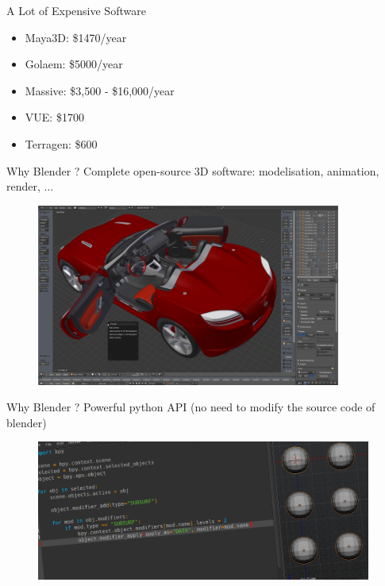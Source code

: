 \documentclass{beamer}
\begin{document}
\begin{frame}{A Lot of Expensive Software}
  \begin{itemize}
    \item Maya3D: \$1470/year
    \item Golaem: \$5000/year
    \item Massive: \$3,500 - \$16,000/year
    \item VUE: \$1700
    \item Terragen: \$600
  \end{itemize}
\end{frame}

\begin{frame}{Why Blender ?}
  Complete open-source 3D software: modelisation, animation, render, ...
    \begin{figure}
        \includegraphics[width=10cm]{blender_mod}
    \end{figure}
\end{frame}

\begin{frame}{Why Blender ?}
  Powerful python API (no need to modify the source code of blender)
  \begin{figure}
        \includegraphics[width=11cm]{blender_script}
    \end{figure}
\end{frame}
\end{document}
